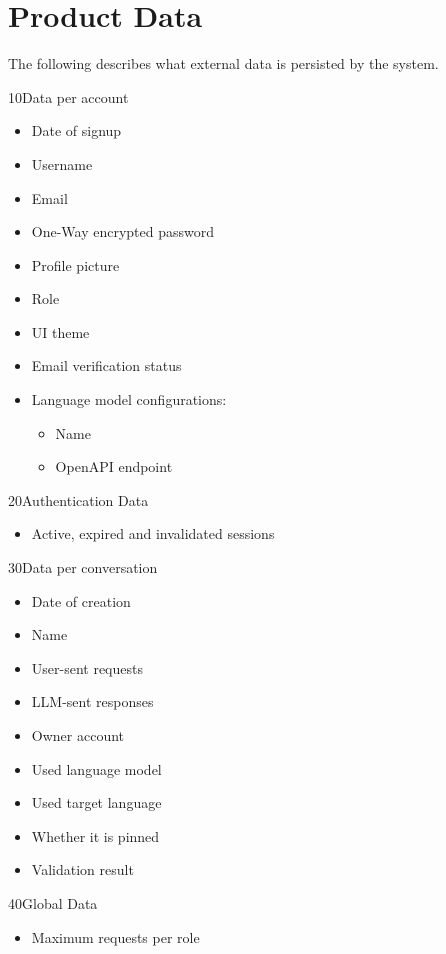 
\chapter{Product Data}
The following describes what external data is persisted by the system.

\begin{data}{10}{Data per account}
	\begin{itemize}
		\item Date of signup
		\item Username
		\item Email
		\item One-Way encrypted password
		\item Profile picture
		\item Role
		\item UI theme
		\item Email verification status
		\item Language model configurations:
		\begin{itemize}
				  \item Name
				  \item OpenAPI endpoint
		\end{itemize}
	\end{itemize}
\end{data}

\begin{data}{20}{Authentication Data}
	\begin{itemize}
		\item Active, expired and invalidated sessions
	\end{itemize}
\end{data}

\begin{data}{30}{Data per conversation}
	\begin{itemize}
		\item Date of creation
		\item Name
		\item User-sent requests
		\item LLM-sent responses
		\item Owner account
		\item Used language model
		\item Used target language
		\item Whether it is pinned
		\item Validation result
	\end{itemize}
\end{data}

\begin{data}{40}{Global Data}
	\begin{itemize}
		\item Maximum requests per role
	\end{itemize}
\end{data}
